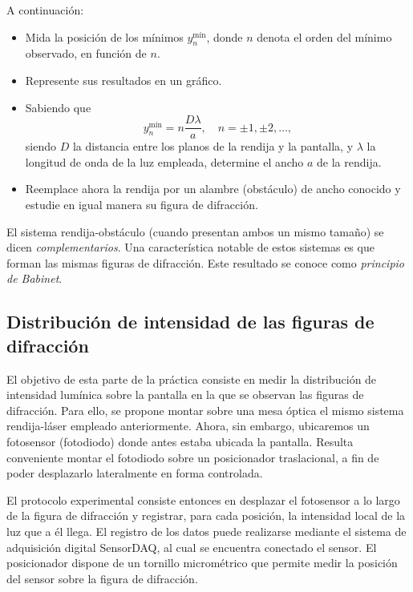 \documentclass[laboratorio]{guia}
\begin{document}
A continuación:
\begin{itemize}
  \item Mida la posición de los mínimos \(y_n^\text{mín}\), donde \(n\) denota el orden del mínimo observado, en función de \(n\).
  \item Represente sus resultados en un gráfico.
  \item Sabiendo que
        \begin{equation}
         y_n^\text{mín} = n \frac{D \lambda}{a}, \quad n = \pm 1, \pm 2,
         \ldots,
        \end{equation}
  siendo \(D\) la distancia entre los planos de la rendija y la pantalla, y \(\lambda\) la longitud de onda de la luz empleada, determine el ancho \(a\) de la rendija.
  \item Reemplace ahora la rendija por un alambre (obstáculo) de ancho conocido y estudie en igual manera su figura de difracción.
\end{itemize}

El sistema rendija-obstáculo (cuando presentan ambos un mismo tamaño) se dicen \emph{complementarios}.
Una característica notable de estos sistemas es que forman las mismas figuras de difracción.
Este resultado se conoce como \emph{principio de Babinet}.


\subsection{Distribución de intensidad de las figuras de difracción}

El objetivo de esta parte de la práctica consiste en medir la distribución de intensidad lumínica sobre la pantalla en la que se observan las figuras de difracción.
Para ello, se propone montar sobre una mesa óptica el mismo sistema rendija-láser empleado anteriormente.
Ahora, sin embargo, ubicaremos un fotosensor (fotodiodo) donde antes estaba ubicada la pantalla. 
Resulta conveniente montar el fotodiodo sobre un posicionador traslacional, a fin de poder desplazarlo lateralmente en forma controlada.

El protocolo experimental consiste entonces en desplazar el fotosensor a lo largo de la figura de difracción y registrar, para cada posición, la intensidad local de la luz que a él llega.
El registro de los datos puede realizarse mediante el sistema de adquisición digital SensorDAQ, al cual se encuentra conectado el sensor.
El posicionador dispone de un tornillo micrométrico que permite medir la posición del sensor sobre la figura de difracción. 
\end{document}
